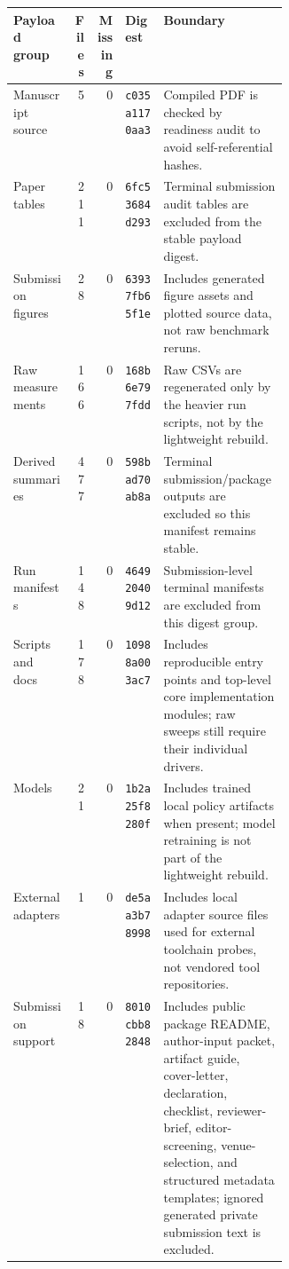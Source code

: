 \begin{tabularx}{\linewidth}{>{\raggedright\arraybackslash}p{0.22\linewidth}rr>{\raggedright\arraybackslash}p{0.14\linewidth}>{\raggedright\arraybackslash}X}
\toprule
Payload group & Files & Missing & Digest & Boundary \\
\midrule
Manuscript source & 5 & 0 & \texttt{c035a1170aa3} & Compiled PDF is checked by readiness audit to avoid self-referential hashes. \\
Paper tables & 211 & 0 & \texttt{6fc53684d293} & Terminal submission audit tables are excluded from the stable payload digest. \\
Submission figures & 28 & 0 & \texttt{63937fb65f1e} & Includes generated figure assets and plotted source data, not raw benchmark reruns. \\
Raw measurements & 166 & 0 & \texttt{168b6e797fdd} & Raw CSVs are regenerated only by the heavier run scripts, not by the lightweight rebuild. \\
Derived summaries & 477 & 0 & \texttt{598bad70ab8a} & Terminal submission/package outputs are excluded so this manifest remains stable. \\
Run manifests & 148 & 0 & \texttt{464920409d12} & Submission-level terminal manifests are excluded from this digest group. \\
Scripts and docs & 178 & 0 & \texttt{10988a003ac7} & Includes reproducible entry points and top-level core implementation modules; raw sweeps still require their individual drivers. \\
Models & 21 & 0 & \texttt{1b2a25f8280f} & Includes trained local policy artifacts when present; model retraining is not part of the lightweight rebuild. \\
External adapters & 1 & 0 & \texttt{de5aa3b78998} & Includes local adapter source files used for external toolchain probes, not vendored tool repositories. \\
Submission support & 18 & 0 & \texttt{8010cbb82848} & Includes public package README, author-input packet, artifact guide, cover-letter, declaration, checklist, reviewer-brief, editor-screening, venue-selection, and structured metadata templates; ignored generated private submission text is excluded. \\
\bottomrule
\end{tabularx}
